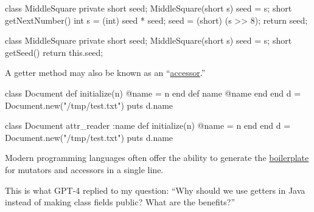 \documentclass{article}
\begin{document}

\pptToc


\begin{pptWide}{2}
{\small\begin{ffcode}
class MiddleSquare {
  private short seed;
  MiddleSquare(short s) { seed = s; }
  short getNextNumber() {
    int s = (int) seed * seed;
    seed = (short) (s >> 8);
    return seed;
  }
}
\end{ffcode}
}
\par\columnbreak\par
{\small\begin{ffcode}
class MiddleSquare {
  private short seed;
  MiddleSquare(short s) { seed = s; }
  short getSeed() {
    return this.seed;
  }
}
\end{ffcode}
}
\end{pptWide}
\par
A getter method may also be known as an ``\ul{accessor}.''
\plush{}

\begin{pptWide}{2}
{\small\begin{ffcode}
class Document
  def initialize(n)
    @name = n
  end
  def name
    @name
  end
end
d = Document.new("/tmp/test.txt")
puts d.name
\end{ffcode}
}
\par\columnbreak\par
{\small\begin{ffcode}
class Document
  attr_reader :name
  def initialize(n)
    @name = n
  end
end
d = Document.new("/tmp/test.txt")
puts d.name
\end{ffcode}
}
\end{pptWide}
\par
Modern programming languages often offer the ability to generate the \ul{boilerplate} for mutators and accessors in a single line.
\plush{}

\begin{pptWide}{2}
\par\columnbreak\par
{}
\end{pptWide}
\par
This is what GPT-4 replied to my question: ``Why should we use getters in Java instead of making class fields public? What are the benefits?''
\plush{}
\end{document}
